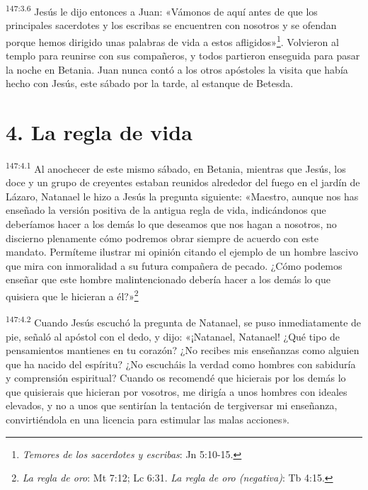 \par
\textsuperscript{147:3.6} Jesús le dijo entonces a Juan: «Vámonos de aquí antes de que los principales sacerdotes y los escribas se encuentren con nosotros y se ofendan porque hemos dirigido unas palabras de vida a estos afligidos»\footnote{\textit{Temores de los sacerdotes y escribas}: Jn 5:10-15.}. Volvieron al templo para reunirse con sus compañeros, y todos partieron enseguida para pasar la noche en Betania. Juan nunca contó a los otros apóstoles la visita que había hecho con Jesús, este sábado por la tarde, al estanque de Betesda.

\section*{4. La regla de vida}
\par
\textsuperscript{147:4.1} Al anochecer de este mismo sábado, en Betania, mientras que Jesús, los doce y un grupo de creyentes estaban reunidos alrededor del fuego en el jardín de Lázaro, Natanael le hizo a Jesús la pregunta siguiente: «Maestro, aunque nos has enseñado la versión positiva de la antigua regla de vida, indicándonos que deberíamos hacer a los demás lo que deseamos que nos hagan a nosotros, no discierno plenamente cómo podremos obrar siempre de acuerdo con este mandato. Permíteme ilustrar mi opinión citando el ejemplo de un hombre lascivo que mira con inmoralidad a su futura compañera de pecado. ¿Cómo podemos enseñar que este hombre malintencionado debería hacer a los demás lo que quisiera que le hicieran a él?»\footnote{\textit{La regla de oro}: Mt 7:12; Lc 6:31. \textit{La regla de oro (negativa)}: Tb 4:15.}

\par
\textsuperscript{147:4.2} Cuando Jesús escuchó la pregunta de Natanael, se puso inmediatamente de pie, señaló al apóstol con el dedo, y dijo: «¡Natanael, Natanael! ¿Qué tipo de pensamientos mantienes en tu corazón? ¿No recibes mis enseñanzas como alguien que ha nacido del espíritu? ¿No escucháis la verdad como hombres con sabiduría y comprensión espiritual? Cuando os recomendé que hicierais por los demás lo que quisierais que hicieran por vosotros, me dirigía a unos hombres con ideales elevados, y no a unos que sentirían la tentación de tergiversar mi enseñanza, convirtiéndola en una licencia para estimular las malas acciones».

